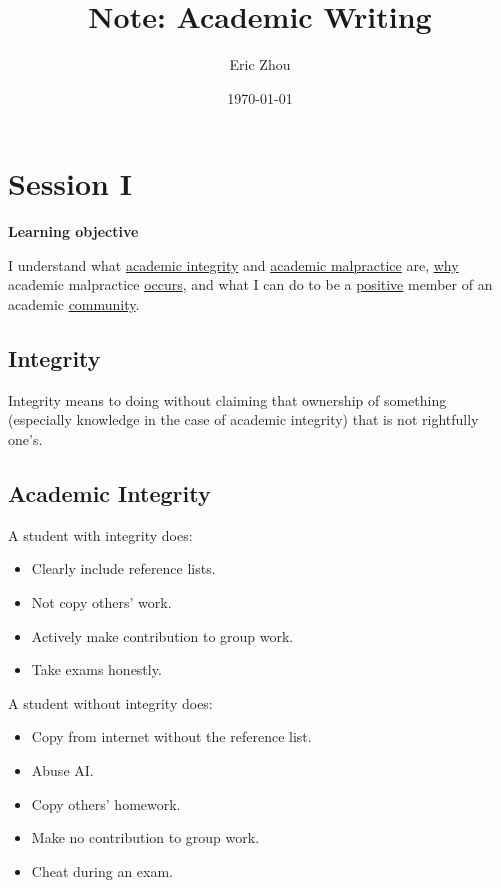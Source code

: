 \documentclass[a4paper]{article}
\title{\textbf{Note: Academic Writing}}
\author{Eric Zhou}
\date{\today}
\begin{document}
    \maketitle
\tableofcontents
\linespread{2}
\clearpage

\section{Session I}


\textbf{Learning objective}

I understand what \underline{academic integrity} and \underline{academic malpractice} are, \underline{why} academic malpractice \underline{occurs}, and what I can do to be a \underline{positive} member of an academic \underline{community}.

\subsection{Integrity}

Integrity means to doing without claiming that ownership of something (especially knowledge in the case of academic integrity) that is not rightfully one's.

\subsection{Academic Integrity}

A student with integrity does:

\begin{itemize}
    \item Clearly include reference lists.
    \item Not copy others' work.
    \item Actively make contribution to group work.
    \item Take exams honestly.
\end{itemize}

A student without integrity does:

\begin{itemize}
    \item Copy from internet without the reference list.
    \item Abuse AI.
    \item Copy others' homework.
    \item Make no contribution to group work.
    \item Cheat during an exam.
\end{itemize}
\end{document}
